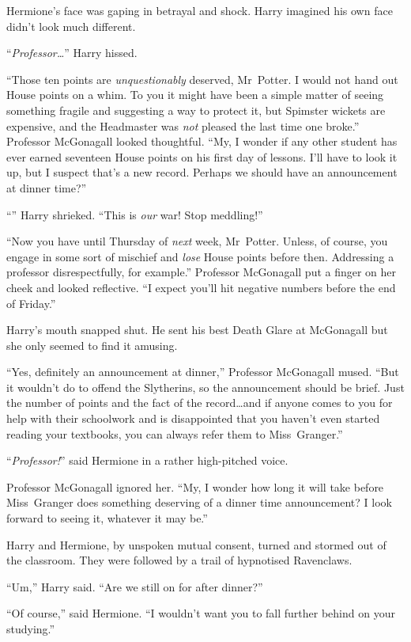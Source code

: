 Hermione’s face was gaping in betrayal and shock. Harry imagined his own face didn’t look much different.

“\emph{Professor…}” Harry hissed.

“Those ten points are \emph{unquestionably} deserved, Mr~Potter. I would not hand out House points on a whim. To you it might have been a simple matter of seeing something fragile and suggesting a way to protect it, but Spimster wickets are expensive, and the Headmaster was \emph{not} pleased the last time one broke.” Professor McGonagall looked thoughtful. “My, I wonder if any other student has ever earned seventeen House points on his first day of lessons. I’ll have to look it up, but I suspect that’s a new record. Perhaps we should have an announcement at dinner time?”

“” Harry shrieked. “This is \emph{our} war! Stop meddling!”

“Now you have until Thursday of \emph{next} week, Mr~Potter. Unless, of course, you engage in some sort of mischief and \emph{lose} House points before then. Addressing a professor disrespectfully, for example.” Professor McGonagall put a finger on her cheek and looked reflective. “I expect you’ll hit negative numbers before the end of Friday.”

Harry’s mouth snapped shut. He sent his best Death Glare at McGonagall but she only seemed to find it amusing.

“Yes, definitely an announcement at dinner,” Professor McGonagall mused. “But it wouldn’t do to offend the Slytherins, so the announcement should be brief. Just the number of points and the fact of the record…and if anyone comes to you for help with their schoolwork and is disappointed that you haven’t even started reading your textbooks, you can always refer them to Miss~Granger.”

“\emph{Professor!}” said Hermione in a rather high-pitched voice.

Professor McGonagall ignored her. “My, I wonder how long it will take before Miss~Granger does something deserving of a dinner time announcement? I look forward to seeing it, whatever it may be.”

Harry and Hermione, by unspoken mutual consent, turned and stormed out of the classroom. They were followed by a trail of hypnotised Ravenclaws.

“Um,” Harry said. “Are we still on for after dinner?”

“Of course,” said Hermione. “I wouldn’t want you to fall further behind on your studying.”

